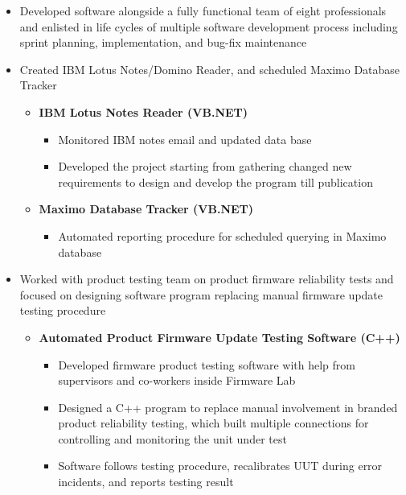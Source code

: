 \documentclass[11pt,a4paper,sans]{moderncv}        %
\begin{document}
{}{
\begin{itemize}
\item Developed software alongside a fully functional team of eight professionals and enlisted in life cycles of multiple software development process including sprint planning, implementation, and bug-fix maintenance
\item Created IBM Lotus Notes/Domino Reader, and scheduled Maximo Database Tracker
    \begin{itemize}
  \item \textbf{IBM Lotus Notes Reader (VB.NET)}
  \begin{itemize}
  \item  Monitored IBM notes email and updated data base
\item Developed the project starting from gathering changed new requirements to design and develop the program till publication
\end{itemize}
\item \textbf{Maximo Database Tracker (VB.NET)}
\begin{itemize}
  \item Automated reporting procedure for scheduled querying in Maximo database
\end{itemize}
\end{itemize}
\end{itemize}
}

{}{
\begin{itemize}
\item Worked with product testing team on product firmware reliability tests and focused on designing software program replacing manual firmware update testing procedure
 \begin{itemize}
  \item \textbf{Automated Product Firmware Update Testing Software (C++)}
  \begin{itemize}
  \item Developed firmware product testing software with help from supervisors and co-workers inside Firmware Lab
  \item  Designed a C++ program to replace manual involvement in branded product reliability testing, which built multiple connections for controlling and monitoring the unit under test
  \item Software follows testing procedure, recalibrates UUT during error incidents, and reports testing result
\end{itemize}
\end{itemize}
\end{itemize}
}
\end{document}
